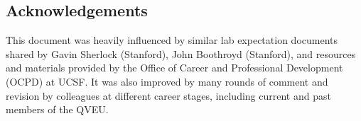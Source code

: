 \documentclass[10pt, letterpaper, twocolumn]{article} %
\begin{document}
\subsection{Acknowledgements}
This document was heavily influenced by similar lab expectation documents shared by Gavin Sherlock (Stanford), John Boothroyd (Stanford), and resources and materials provided by the Office of Career and Professional Development (OCPD) at UCSF. It was also improved by many rounds of comment and revision by colleagues at different career stages, including current and past members of the QVEU.

\printbibliography[title={Bibliography}] %

\end{document}
